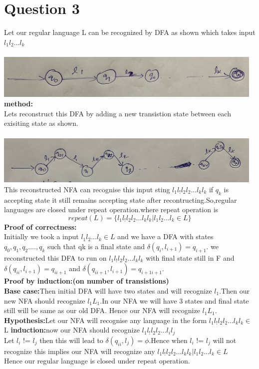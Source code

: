 \documentclass{article}
\begin{document}
\pagebreak
\section{Question 3}

Let our regular language L can be recognized by DFA as shown which takes input $l_1l_2...l_k$\\ \\
\includegraphics[width=13cm]{1.jpeg}\\
\textbf{method:}\\
Lets reconstruct this DFA by adding a new transistion state between each exisiting state as shown.\\\\
\includegraphics[width=13cm]{2.jpeg}\\
This reconstructed NFA can recognise this input sting $l_1l_!l_2l_2...l_kl_k$ if $q_k$ is accepting state it still remains accepting state after recontructing.So,regular languages are closed under repeat operation.where repeat operation is\\
$$repeat(L)=\{l_1l_!l_2l_2...l_kl_k|l_1l_2...l_k \in L \}$$
\textbf{Proof of correctness:}\\
Initially we took a input $l_1l_2...l_k \in L$ and we have a DFA with states $q_0,q_1,q_2....,q_k$
such that qk is a final state and $\delta(q_i,l_{i+1})=q_{i+1}$.
we reconstructed this DFA to run on $l_1l_!l_2l_2...l_kl_k$ with final state still in F and $\delta(q_{ii},l_{i+1})=q_{ii+1}$ and $\delta(q_{ii+1},l_{i+1})=q_{i+1i+1}$.\\
\textbf{Proof by induction:(on number of transistions)}\\
\textbf{Base case:}Then initial DFA will have two states and will recognize $l_1$.Then our new NFA should recognize $l_1L_1$.In our NFA we will have 3 states and final state still will be same as our old DFA. Hence our NFA will recognize  $l_1L_1$.\\
\textbf{Hypothesis:}Let our NFA will recognise any language in the form $l_1l_!l_2l_2...l_kl_k \in $L 
\textbf{induction:}now our NFA should recognize $l_1l_!l_2l_2...l_il_j$ \\
Let $l_i$ != $l_j$ then this will lead to $\delta(q_{ii},l_{j})=\phi$.Hence when $l_i$ != $l_j$ will not recognize this implies our NFA will recognize any $l_1l_!l_2l_2...l_kl_k|l_1l_2...l_k \in L$\\
Hence our regular language is closed under repeat operation.
\end{document}
